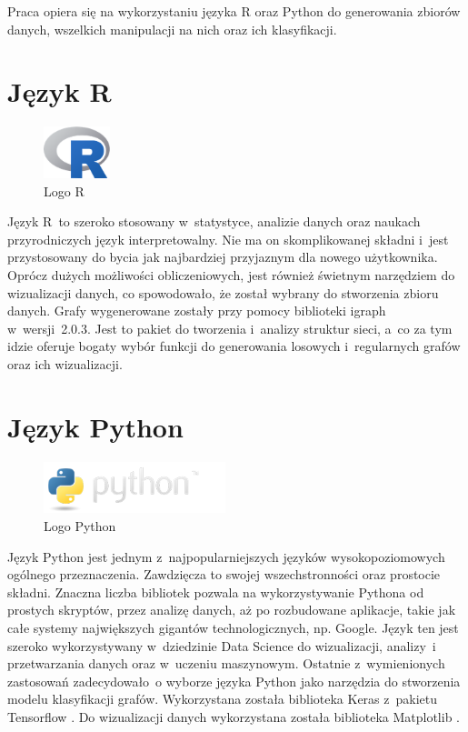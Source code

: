Praca opiera się na wykorzystaniu języka R \cite{strR} oraz Python \cite{strPython} do generowania zbiorów danych,
wszelkich manipulacji na nich oraz ich klasyfikacji.

\section{Język R}

\begin{figure}[ht]
	\centering
	\includegraphics[height=1.5cm]{resources/technologies/images/logo_r.png}
	\caption{Logo R \cite{strR}}
	\label{Fig:tech-r}
\end{figure}
\FloatBarrier

Język R~to szeroko stosowany w~statystyce, analizie danych oraz naukach przyrodniczych język interpretowalny.
Nie ma on skomplikowanej składni i~jest przystosowany do bycia jak najbardziej przyjaznym dla nowego użytkownika.
Oprócz dużych możliwości obliczeniowych, jest również świetnym narzędziem do wizualizacji danych,
co spowodowało, że został wybrany do stworzenia zbioru danych.
Grafy wygenerowane zostały przy pomocy biblioteki igraph \cite{strIgraph} w~wersji~2.0.3.
Jest to pakiet do tworzenia i~analizy struktur sieci, a~co za tym idzie oferuje bogaty wybór funkcji do
generowania losowych i~regularnych grafów oraz ich wizualizacji.

\clearpage

\section{Język Python}

\begin{figure}[ht]
	\centering
	\includegraphics[height=1.5cm]{resources/technologies/images/logo_python.png}
	\caption{Logo Python \cite{strPython}}
	\label{Fig:tech-python}
\end{figure}
\FloatBarrier

Język Python jest jednym z~najpopularniejszych języków wysokopoziomowych ogólnego przeznaczenia.
Zawdzięcza to swojej wszechstronności oraz prostocie składni.
Znaczna liczba bibliotek pozwala na wykorzystywanie Pythona od
prostych skryptów, przez analizę danych, aż po rozbudowane aplikacje, takie jak całe
systemy największych gigantów technologicznych, np. Google. Język ten jest szeroko
wykorzystywany w~dziedzinie Data Science do wizualizacji, analizy~i przetwarzania danych oraz w~uczeniu maszynowym.
Ostatnie z~wymienionych zastosowań zadecydowało~o wyborze języka Python jako narzędzia do stworzenia modelu klasyfikacji grafów.
Wykorzystana została biblioteka Keras z~pakietu Tensorflow \cite{strTensorFlow}.
Do wizualizacji danych wykorzystana została biblioteka Matplotlib \cite{strMatplotlib}.


